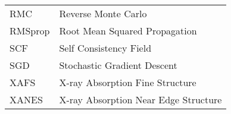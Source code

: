 \begin{table}[h]
\begin{tabular}{ll}
    RMC   &  Reverse Monte Carlo                            \\
    RMSprop & Root Mean Squared Propagation                 \\
    SCF   & Self Consistency Field                          \\
    SGD   & Stochastic Gradient Descent                     \\
    XAFS  & X-ray Absorption Fine Structure                 \\
    XANES & X-ray Absorption Near Edge Structure
    \end{tabular}
    \label{tab:list-of-Abbreviations}
\end{table}